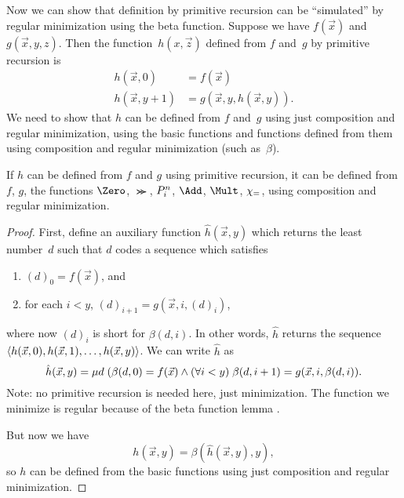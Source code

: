\documentclass[../../../include/open-logic-section]{subfiles}
\begin{document}

Now we can show that definition by primitive recursion can be
``simulated'' by regular minimization using the beta function. Suppose
we have $f(\vec x)$ and $g(\vec x, y, z)$. Then the function~$h(x,\vec
z)$ defined from $f$ and~$g$ by primitive recursion is
\begin{align*}
h(\vec x, 0) & =  f(\vec x) \\
h(\vec x, y+1) & =  g(\vec x, y, h(\vec x, y)).
\end{align*}
We need to show that $h$ can be defined from $f$ and~$g$ using just
composition and regular minimization, using the basic functions and
functions defined from them using composition and regular minimization
(such as~$\beta$).

\begin{lem}
If $h$ can be defined from $f$ and $g$ using primitive recursion, it
can be defined from $f$, $g$, the functions $\Zero$, $\Succ$,
$P^{n}_{i}$, $\Add$, $\Mult$, $\chi_{=}$, using composition and
regular minimization.
\end{lem}

\begin{proof}
First, define an auxiliary function $\hat h(\vec x, y)$ which returns
the least number~$d$ such that $d$ codes a sequence which satisfies
\begin{enumerate}
\item $(d)_0 = f(\vec x)$, and
\item for each $i < y$, $(d)_{i+1} = g(\vec x, i, (d)_i)$,
\end{enumerate}
where now $(d)_i$ is short for $\beta(d,i)$. In other words, $\hat h$
returns the sequence $\langle h(\vec x, 0), h(\vec x, 1), \dots, h(\vec
x, y) \rangle$. We can write $\hat h$ as
\[
\hat h(\vec x, y) = \mu d \; (\beta(d,0) = f(\vec x) \land (\forall i <
  y)\; \beta(d,i+1) = g(\vec x, i,\beta(d,i)).
\]
Note: no primitive recursion is needed here, just minimization. The
function we minimize is regular because of the beta function lemma
.

But now we have
\[
h(\vec x, y) = \beta(\hat h(\vec x, y), y),
\]
so $h$ can be defined from the basic functions using just composition
and regular minimization.
\end{proof}
\end{document}
